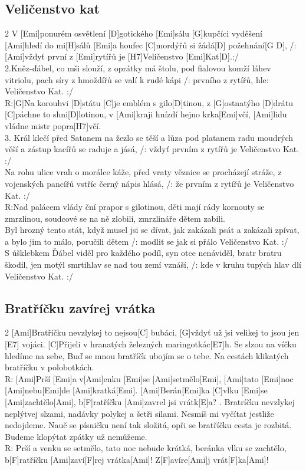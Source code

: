 \documentclass[12pt]{article}
\begin{document}
\subsection{Veličenstvo kat}
\begin{multicols}{2}
	V [Emi]ponurém osvětlení [D]gotického [Emi]sálu
	[G]kupčíci vyděšení [Ami]hledí do mi[H]sálů
	[Emi]a houfec [C]mordýřů si žádá[D] požehnání[G D],
	/:[Ami]vždyť první z [Emi]rytířů je [H7]Veličenstvo [Emi]Kat[D].:/
	\\
	2.Kněz-ďábel, co mši slouží, z oprátky má 
	štolu,
	pod fialovou komží láhev vitriolu,
	pach síry z hmoždířů se valí k rudé kápi
	/: prvního z rytířů, hle: Veličenstvo Kat. :/
	\\
	R:[G]Na korouhvi [D]státu [C]je emblém s gilo[D]tinou,
	z [G]ostnatýho [D]drátu [C]páchne to shni[D]lotinou,
	v [Ami]kraji hnízdí hejno krka[Emi]včí,
	[Ami]lidu vládne mistr popra[H7]včí.
	\\
	3. Král klečí před Satanem na žezlo se těší
	a lůza pod platanem radu moudrých věší
	a zástup kacířů se raduje a jásá,
	/: vždyť prvním z rytířů je Veličenstvo Kat. :/
	\\
	Na rohu ulice vrah o morálce káže,
	před vraty věznice se procházejí stráže,
	z vojenských pancířů vstříc černý nápis 
	hlásá,
	/: že prvním z rytířů je Veličenstvo Kat. :/
	\\
	R:Nad palácem vlády ční prapor s gilotinou,
	děti mají rády kornouty se zmrzlinou,
	soudcové se na ně zlobili,
	zmrzlináře dětem zabili.
	\\
	Byl hrozný tento stát, 
	když musel jsi se dívat,
	jak zakázali psát a zakázali zpívat,
	a bylo jim to málo, poručili dětem
	/: modlit se jak si přálo Veličenstvo Kat. :/
	\\
	S úšklebkem Ďábel viděl pro každého podíl,
	syn otce nenáviděl, bratr bratru škodil,
	jen motýl smrtihlav se nad tou zemí vznáší,
	/: kde v kruhu tupých hlav dlí Veličenstvo Kat. :/
\end{multicols}

\subsection{Bratříčku zavírej vrátka}
\begin{multicols}{2}
	[Ami]Bratříčku nevzlykej to nejsou[C] bubáci,
	[G]vždyť už jsi velikej to jsou jen [E7] vojáci.
	[C]Přijeli v hranatých železných maringotkác[E7]h.
	Se slzou na víčku hledíme na sebe,
	Buď se mnou bratříčk ubojím se o tebe. 
	Na cestách klikatých bratříčku v 
	polobotkách.
	\\
	R: [Ami]Prší [Emi]a v[Ami]enku [Emi]se [Ami]setmělo[Emi],
	[Ami]tato [Emi]noc [Ami]nebu[Emi]de [Ami]kratká[Emi].
	[Ami]Berán[Emi]ka [C]vlku [Emi]se [Ami]zachtělo[Ami], 
	b[F]ratříčku [Ami]zavrel jsi vrátk[E]a?
	. Bratríčku nevzlykej neplýtvej slzami,
	nadávky polykej a šetři silami.
	Nesmíš mi vyčítat jestliže nedojdeme.
	Nauč se písničku není tak složitá,
	opři se bratříčku cesta je rozbitá.
	Budeme klopýtat zpátky už nemůžeme.
	\\
	R: Prší a venku se setmělo, 
	tato noc nebude krátká, 
	beránka vlku se zachtělo, 
	b[F]ratříčku [Ami]zaví[F]rej vrátka[Ami]!
	Z[F]avíre[Ami]j vrát[F]ka[Ami]!
\end{multicols}
\end{document}
